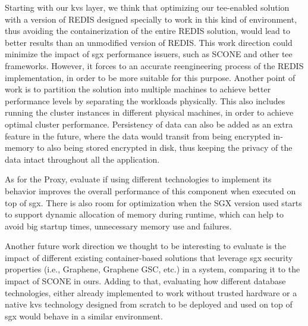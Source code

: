 Starting with our \gls{kvs} layer, we think that optimizing our \gls{tee}-enabled solution with a version of REDIS designed specially to work in this kind of environment, thus avoiding the containerization of the entire REDIS solution, would lead to better results than an unmodified version of REDIS. This work direction could minimize the impact of \gls{sgx} performance issuers, such as SCONE and other \gls{tee} frameworks. However, it forces to an accurate reengineering process of the REDIS implementation, in order to be more suitable for this purpose.
Another point of work is to partition the solution into multiple machines to achieve better performance levels by separating the workloads physically. This also includes running the cluster instances in different physical machines, in order to achieve optimal cluster performance.
Persistency of data can also be added as an extra feature in the future, where the data would transit from being encrypted in-memory to also being stored encrypted in disk, thus keeping the privacy of the data intact throughout all the application.

As for the Proxy, evaluate if using different technologies to implement its behavior improves the overall performance of this component when executed on top of \gls{sgx}.
There is also room for optimization when the SGX version used starts to support dynamic allocation of memory during runtime, which can help to avoid big startup times, unnecessary memory use and failures.

Another future work direction we thought to be interesting to evaluate is the impact of different existing container-based solutions that leverage \gls{sgx} security properties (i.e., Graphene, Graphene GSC, etc.) in a system, comparing it to the impact of SCONE in ours. 
Adding to that, evaluating how different database technologies, either already implemented to work without trusted hardware or a native \gls{kvs} technology designed from scratch to be deployed and used on top of \gls{sgx} would behave in a similar environment.
